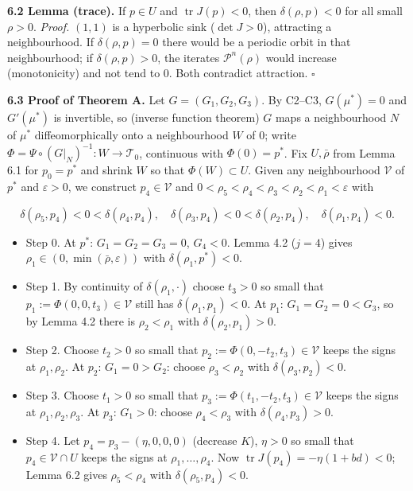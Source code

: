 \documentclass[11pt,a4paper]{report}
\begin{document}
\textbf{6.2 Lemma (trace).} If \(p\in U\) and \(\operatorname{tr}J(p)<0\), then \(\delta(\rho,p)<0\) for all small
\(\rho>0\). \emph{Proof.} \((1,1)\) is a hyperbolic sink (\(\det J>0\)), attracting a neighbourhood. If
\(\delta(\rho,p)=0\) there would be a periodic orbit in that neighbourhood; if \(\delta(\rho,p)>0\), the
iterates \(\mathcal P^n(\rho)\) would increase (monotonicity) and not tend to 0. Both contradict attraction.
\(\square\)

\textbf{6.3 Proof of Theorem A.} Let \(G=(G_1,G_2,G_3)\). By C2--C3, \(G(\mu^*)=0\) and \(G'(\mu^*)\) is invertible,
so (inverse function theorem) \(G\) maps a neighbourhood \(N\) of \(\mu^*\) diffeomorphically onto a
neighbourhood \(W\) of \(0\); write \(\Phi=\Psi\circ(G|_N)^{-1}:W\to\mathcal T_0\), continuous with
\(\Phi(0)=p^*\). Fix \(U,\bar\rho\) from Lemma 6.1 for \(p_0=p^*\) and shrink \(W\) so that \(\Phi(W)\subset U\).
Given any neighbourhood \(\mathcal V\) of \(p^*\) and \(\varepsilon>0\), we construct \(p_4\in\mathcal V\) and
\(0<\rho_5<\rho_4<\rho_3<\rho_2<\rho_1<\varepsilon\) with

\[\delta(\rho_5,p_4)<0<\delta(\rho_4,p_4),\quad \delta(\rho_3,p_4)<0<\delta(\rho_2,p_4),\quad \delta(\rho_1,p_4)<0 .\]

\begin{itemize}
\tightlist
\item
  Step 0. At \(p^*\): \(G_1=G_2=G_3=0\), \(G_4<0\). Lemma 4.2 (\(j=4\)) gives \(\rho_1\in(0,\min(\bar\rho,\varepsilon))\)
  with \(\delta(\rho_1,p^*)<0\).
\item
  Step 1. By continuity of \(\delta(\rho_1,\cdot)\) choose \(t_3>0\) so small that \(p_1:=\Phi(0,0,t_3)\in\mathcal V\)
  still has \(\delta(\rho_1,p_1)<0\). At \(p_1\): \(G_1=G_2=0<G_3\), so by Lemma 4.2 there is \(\rho_2<\rho_1\)
  with \(\delta(\rho_2,p_1)>0\).
\item
  Step 2. Choose \(t_2>0\) so small that \(p_2:=\Phi(0,-t_2,t_3)\in\mathcal V\) keeps the signs at \(\rho_1,\rho_2\).
  At \(p_2\): \(G_1=0>G_2\): choose \(\rho_3<\rho_2\) with \(\delta(\rho_3,p_2)<0\).
\item
  Step 3. Choose \(t_1>0\) so small that \(p_3:=\Phi(t_1,-t_2,t_3)\in\mathcal V\) keeps the signs at
  \(\rho_1,\rho_2,\rho_3\). At \(p_3\): \(G_1>0\): choose \(\rho_4<\rho_3\) with \(\delta(\rho_4,p_3)>0\).
\item
  Step 4. Let \(p_4=p_3-(\eta,0,0,0)\) (decrease \(K\)), \(\eta>0\) so small that \(p_4\in\mathcal V\cap U\) keeps the
  signs at \(\rho_1,\dots,\rho_4\). Now \(\operatorname{tr}J(p_4)=-\eta(1+bd)<0\); Lemma 6.2 gives \(\rho_5<\rho_4\) with
  \(\delta(\rho_5,p_4)<0\).
\end{itemize}
\end{document}
